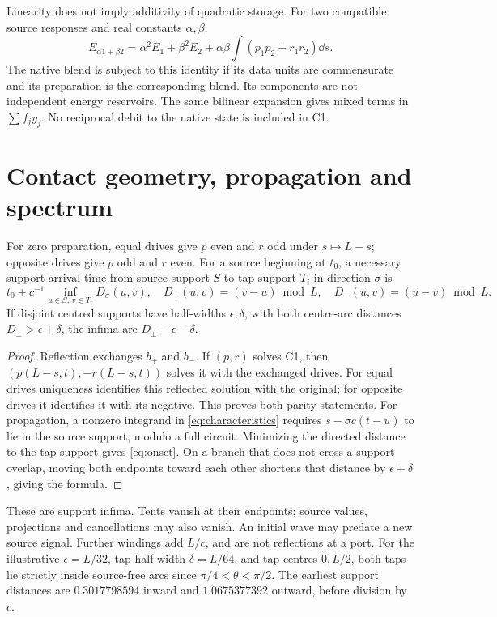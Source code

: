 Linearity does not imply additivity of quadratic storage. For two compatible source responses and real constants $\alpha,\beta$,
\begin{equation}\label{eq:mixed}
 E_{\alpha 1+\beta 2}=\alpha^2E_1+\beta^2E_2+
 \alpha\beta\int(p_1p_2+r_1r_2)\dd s.
\end{equation}
The native blend is subject to this identity if its data units are commensurate and its preparation is the corresponding blend. Its components are not independent energy reservoirs. The same bilinear expansion gives mixed terms in $\sum f_jy_j$. No reciprocal debit to the native state is included in C1.

\section{Contact geometry, propagation and spectrum}\label{sec:spectrum}
\begin{proposition}\label{prop:parity}
For zero preparation, equal drives give $p$ even and $r$ odd under $s\mapsto L-s$; opposite drives give $p$ odd and $r$ even. For a source beginning at $t_0$, a necessary support-arrival time from source support $S$ to tap support $T_i$ in direction $\sigma$ is
\begin{equation}\label{eq:onset}
 t_0+c^{-1}\inf_{u\in S,\,v\in T_i}D_\sigma(u,v),
 \quad D_+(u,v)=(v-u)\bmod L,\quad D_-(u,v)=(u-v)\bmod L.
\end{equation}
If disjoint centred supports have half-widths $\epsilon,\delta$, with both centre-arc distances $D_\pm>\epsilon+\delta$, the infima are $D_\pm-\epsilon-\delta$.
\end{proposition}
\begin{proof}
Reflection exchanges $b_+$ and $b_-$. If $(p,r)$ solves C1, then $(p(L-s,t),-r(L-s,t))$ solves it with the exchanged drives. For equal drives uniqueness identifies this reflected solution with the original; for opposite drives it identifies it with its negative. This proves both parity statements. For propagation, a nonzero integrand in \eqref{eq:characteristics} requires $s-\sigma c(t-u)$ to lie in the source support, modulo a full circuit. Minimizing the directed distance to the tap support gives \eqref{eq:onset}. On a branch that does not cross a support overlap, moving both endpoints toward each other shortens that distance by $\epsilon+\delta$, giving the formula.
\end{proof}

These are support infima. Tents vanish at their endpoints; source values, projections and cancellations may also vanish. An initial wave may predate a new source signal. Further windings add $L/c$, and are not reflections at a port. For the illustrative $\epsilon=L/32$, tap half-width $\delta=L/64$, and tap centres $0,L/2$, both taps lie strictly inside source-free arcs since $\pi/4<\theta<\pi/2$. The earliest support distances are $0.3017798594$ inward and $1.0675377392$ outward, before division by $c$.

